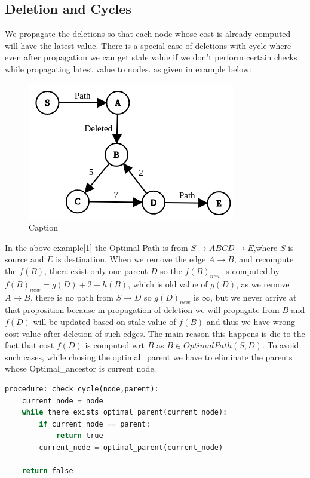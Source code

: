 \documentclass[a4paper]{article}
\begin{document}
\subsection{Deletion and Cycles}
We propagate the deletions so that each node whose cost is already computed will have the latest value. There is a special case of deletions with cycle where even after propagation we can get stale value if we don't perform  certain checks while propagating latest value to nodes. as given in example below:
\begin{figure}[H]
    \centering
    \includegraphics[scale=0.45]{img/cycle.png}
    \caption{Caption}
    \label{fig:delete_cycle}
\end{figure}
In the above example[\ref{fig:delete_cycle}] the Optimal Path is from $S \rightarrow ABCD \rightarrow E$,where $S$ is source and $E$ is destination. When we remove the edge $A \rightarrow B$, and recompute the $f(B)$, there exist only one parent $D$ so the $f(B)_{new}$ is computed by $f(B)_{new} = g(D) + 2 + h(B)$, which is old value of $g(D)$, as we remove $A \rightarrow B$, there is no path from $S \rightarrow D$ so $g(D)_{new}$ is $\infty$, but we never arrive at that proposition because in propagation of deletion we will propagate from $B$  and $f(D)$ will be updated based on stale value of $f(B)$ and thus we have wrong cost value after deletion of such edges. The main reason this happens is die to the fact that cost $f(D)$ is computed wrt $B$ as $B \in OptimalPath(S,D)$. To avoid such cases, while chosing the optimal\_parent we have to eliminate the parents whose Optimal\_ancestor is current node.\\
\begin{lstlisting}[language=python, caption=Check Cycles]
procedure: check_cycle(node,parent):
    current_node = node
    while there exists optimal_parent(current_node):
        if current_node == parent:
            return true
        current_node = optimal_parent(current_node)
    
    return false
\end{lstlisting}
\end{document}
